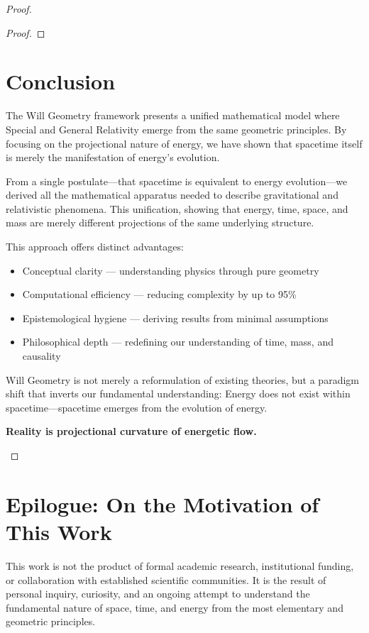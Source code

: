 \documentclass{article}
\begin{document}
\begin{proof}
\begin{proof}
\end{proof}


\section{Conclusion}

The Will Geometry framework presents a unified mathematical model where Special and General Relativity emerge from the same geometric principles. By focusing on the projectional nature of energy, we have shown that spacetime itself is merely the manifestation of energy's evolution.

From a single postulate—that spacetime is equivalent to energy evolution—we derived all the mathematical apparatus needed to describe gravitational and relativistic phenomena. This unification, showing that energy, time, space, and mass are merely different projections of the same underlying structure.

This approach offers distinct advantages:
\begin{itemize}
\item Conceptual clarity — understanding physics through pure geometry
\item Computational efficiency — reducing complexity by up to 95\%
\item Epistemological hygiene — deriving results from minimal assumptions
\item Philosophical depth — redefining our understanding of time, mass, and causality
\end{itemize}

Will Geometry is not merely a reformulation of existing theories, but a paradigm shift that inverts our fundamental understanding: Energy does not exist within spacetime—spacetime emerges from the evolution of energy.

\begin{tcolorbox}[colback=gray!5, colframe=black!80!black, title=Final Principle]
\textbf{Reality is projectional curvature of energetic flow.}
\end{tcolorbox}
\end{proof}

\section{Epilogue: On the Motivation of This Work}

This work is not the product of formal academic research, institutional funding, or collaboration with established scientific communities. It is the result of personal inquiry, curiosity, and an ongoing attempt to understand the fundamental nature of space, time, and energy from the most elementary and geometric principles.
\end{document}
